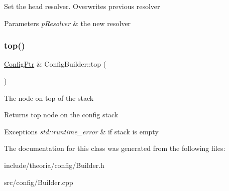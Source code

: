 Set the head resolver. Overwrites previous resolver 
\begin{DoxyParams}{Parameters}
{\em p\+Resolver} & the new resolver \\
\hline
\end{DoxyParams}
\mbox{\label{classtheoria_1_1config_1_1ConfigBuilder_a394d42770a90532be340a8af46868f79}} 
\subsubsection{\texorpdfstring{top()}{top()}}
{\footnotesize\ttfamily \hyperlink{classtheoria_1_1config_1_1ConfigBuilder_a31d4cfc983e8ad468c483822731d790f}{Config\+Ptr} \& Config\+Builder\+::top (\begin{DoxyParamCaption}{ }\end{DoxyParamCaption})}

The node on top of the stack \begin{DoxyReturn}{Returns}
top node on the config stack 
\end{DoxyReturn}

\begin{DoxyExceptions}{Exceptions}
{\em std\+::runtime\+\_\+error} & if stack is empty \\
\hline
\end{DoxyExceptions}


The documentation for this class was generated from the following files\+:\begin{DoxyCompactItemize}
\item 
include/theoria/config/Builder.\+h\item 
src/config/Builder.\+cpp\end{DoxyCompactItemize}

